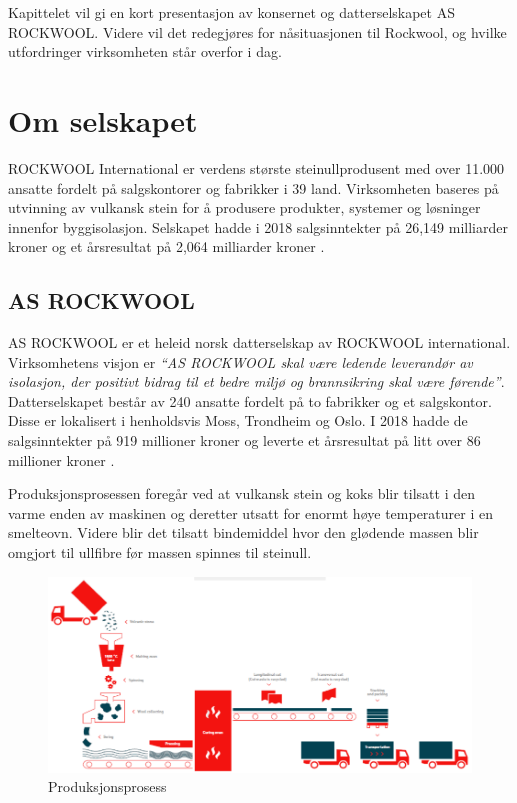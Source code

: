 Kapittelet vil gi en kort presentasjon av konsernet og datterselskapet AS ROCKWOOL. Videre vil det redegjøres for nåsituasjonen til Rockwool, og hvilke utfordringer virksomheten står overfor i dag.

\section{Om selskapet}
ROCKWOOL International er verdens største steinullprodusent med over 11.000 ansatte fordelt på salgskontorer og fabrikker i 39 land. Virksomheten baseres på utvinning av vulkansk stein for å produsere produkter, systemer og løsninger innenfor byggisolasjon. Selskapet hadde i 2018 salgsinntekter på 26,149 milliarder kroner og et årsresultat på 2,064 milliarder kroner \cite{annualReport}.

\subsection{AS ROCKWOOL}
AS ROCKWOOL er et heleid norsk datterselskap av ROCKWOOL international. Virksomhetens visjon er \textit{“AS ROCKWOOL skal være ledende leverandør av isolasjon, der positivt bidrag til et bedre miljø og brannsikring skal være førende”}. Datterselskapet består av 240 ansatte fordelt på to fabrikker og et salgskontor. Disse er lokalisert i henholdsvis Moss, Trondheim og Oslo. I 2018 hadde de salgsinntekter på 919 millioner kroner og leverte et årsresultat på litt over 86 millioner kroner \cite{osloRegnskap}.

\indent \newline
Produksjonsprosessen foregår ved at vulkansk stein og koks blir tilsatt i den varme enden av maskinen og deretter utsatt for enormt høye temperaturer i en smelteovn. Videre blir det tilsatt bindemiddel hvor den glødende massen blir omgjort til ullfibre før massen spinnes til steinull.

\begin{figure}[H]
\centering
\includegraphics [scale=0.95]{bilder/produksjonsprosess.png}
\caption{Produksjonsprosess}
\label{fig:produksjonsprosess}
\end{figure}

